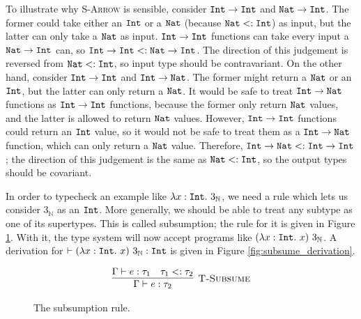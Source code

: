 To illustrate why \textsc{S-Arrow} is sensible, consider $\mathtt{Int} \rightarrow \mathtt{Int}$ and $\mathtt{Nat} \rightarrow \mathtt{Int}$. The former could take either an $\mathtt{Int}$ or a $\mathtt{Nat}$ (because $\mathtt{Nat} <: \mathtt{Int}$) as input, but the latter can only take a $\mathtt{Nat}$ as input. $\mathtt{Int} \rightarrow \mathtt{Int}$ functions can take every input a $\mathtt{Nat} \rightarrow \mathtt{Int}$ can, so $\mathtt{Int} \rightarrow \mathtt{Int} <: \mathtt{Nat} \rightarrow \mathtt{Int}$. The direction of this judgement is reversed from $\mathtt{Nat} <: \mathtt{Int}$, so input type should be contravariant. On the other hand, consider $\mathtt{Int} \rightarrow \mathtt{Int}$ and $\mathtt{Int} \rightarrow \mathtt{Nat}$. The former might return a $\mathtt{Nat}$ or an $\mathtt{Int}$, but the latter can only return a $\mathtt{Nat}$. It would be safe to treat $\mathtt{Int} \rightarrow \mathtt{Nat}$ functions as $\mathtt{Int} \rightarrow \mathtt{Int}$ functions, because the former only return $\mathtt{Nat}$ values, and the latter is allowed to return $\mathtt{Nat}$ values. However, $\mathtt{Int} \rightarrow \mathtt{Int}$ functions could return an $\mathtt{Int}$ value, so it would not be safe to treat them as a $\mathtt{Int} \rightarrow \mathtt{Nat}$ function, which can only return a $\mathtt{Nat}$ value. Therefore, $\mathtt{Int} \rightarrow \mathtt{Nat} <: \mathtt{Int} \rightarrow \mathtt{Int}$; the direction of this judgement is the same as $\mathtt{Nat} <: \mathtt{Int}$, so the output types should be covariant.

In order to typecheck an example like $\lambda x: \mathtt{Int}.~3_{\mathbb{N}}$, we need a rule which lets us consider $3_{\mathbb{N}}$ as an $\mathtt{Int}$. More generally, we should be able to treat any subtype as one of its supertypes. This is called subsumption; the rule for it is given in Figure \ref{fig:stlc_subsumption}. With it, the type system will now accept programs like $(\lambda x: \mathtt{Int}.~x)~3_{\mathbb{N}}$. A derivation for $\vdash (\lambda x: \mathtt{Int}.~x)~3_{\mathbb{N}}: \mathtt{Int}$ is given in Figure \ref{fig:subsume_derivation}.


\begin{figure}[h]

\fbox{$\tau <: \tau$}

	
\[
\begin{array}{c}

\infer[\textsc{T-Subsume}]
	{\Gamma \vdash e: \tau_2}
	{\Gamma \vdash e: \tau_1 & \tau_1 <: \tau_2 }

\end{array}
\]

\vspace{-12pt}
\caption{The subsumption rule.}
\label{fig:stlc_subsumption}
\end{figure}

